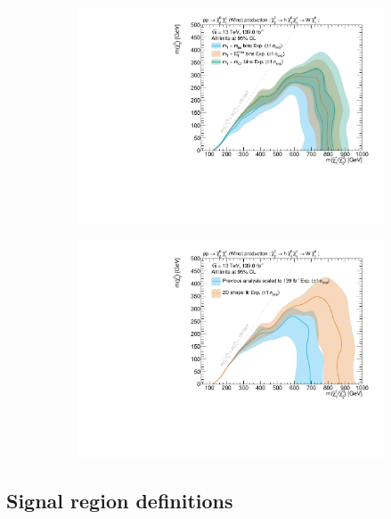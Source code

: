  \begin{figure}
	\centering
	\begin{subfigure}[b]{0.5\linewidth}
		\centering\includegraphics[width=1.0\textwidth]{HF/plot_binnings}
		\caption{\label{fig:plot_binnings}}
	\end{subfigure}\hfill
	\begin{subfigure}[b]{0.5\linewidth}
		\centering\includegraphics[width=1.0\textwidth]{HF/plot_2d_shapefit}
		\caption{}
	\end{subfigure}\hfill

	\caption{}
	\label{fig:results_HF_scans}
\end{figure}

\subsection{Signal region definitions}

